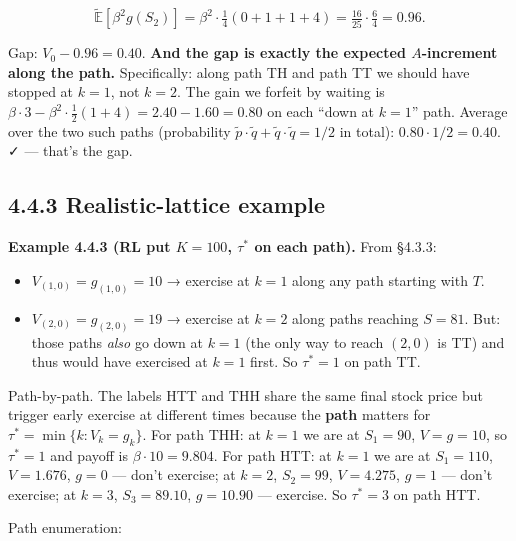 \documentclass[
  10pt,
  twoside]{book}
\providecommand{\tightlist}{%
  \setlength{\itemsep}{0pt}\setlength{\parskip}{0pt}}
\begin{document}
\[\tilde{\mathbb{E}}[\beta^2 g(S_2)] = \beta^2\!\cdot\!\tfrac{1}{4}(0 + 1 + 1 + 4) = \tfrac{16}{25}\!\cdot\!\tfrac{6}{4} = 0.96.\]

Gap: \(V_0 - 0.96 = 0.40\). \textbf{And the gap is exactly the expected
\(A\)-increment along the path.} Specifically: along path TH and path TT
we should have stopped at \(k = 1\), not \(k = 2\). The gain we forfeit
by waiting is
\(\beta\cdot 3 - \beta^2\cdot \tfrac{1}{2}(1 + 4) = 2.40 - 1.60 = 0.80\)
on each ``down at \(k=1\)'' path. Average over the two such paths
(probability \(\tilde p \cdot \tilde q + \tilde q \cdot \tilde q = 1/2\)
in total): \(0.80 \cdot 1/2 = 0.40\). ✓ --- that's the gap.

\subsection{4.4.3 Realistic-lattice
example}\label{realistic-lattice-example-1}

\textbf{Example 4.4.3 (RL put \(K=100\), \(\tau^*\) on each path).} From
§4.3.3:

\begin{itemize}
\tightlist
\item
  \(V_{(1,0)} = g_{(1,0)} = 10\) → exercise at \(k=1\) along any path
  starting with \(T\).
\item
  \(V_{(2,0)} = g_{(2,0)} = 19\) → exercise at \(k=2\) along paths
  reaching \(S=81\). But: those paths \emph{also} go down at \(k=1\)
  (the only way to reach \((2,0)\) is TT) and thus would have exercised
  at \(k=1\) first. So \(\tau^* = 1\) on path TT.
\end{itemize}

Path-by-path. The labels HTT and THH share the same final stock price
but trigger early exercise at different times because the \textbf{path}
matters for \(\tau^* = \min\{k: V_k = g_k\}\). For path THH: at \(k=1\)
we are at \(S_1 = 90\), \(V = g = 10\), so \(\tau^* = 1\) and payoff is
\(\beta\cdot 10 = 9.804\). For path HTT: at \(k=1\) we are at
\(S_1 = 110\), \(V = 1.676\), \(g = 0\) --- don't exercise; at \(k=2\),
\(S_2 = 99\), \(V = 4.275\), \(g = 1\) --- don't exercise; at \(k=3\),
\(S_3 = 89.10\), \(g = 10.90\) --- exercise. So \(\tau^* = 3\) on path
HTT.

Path enumeration:
\end{document}

